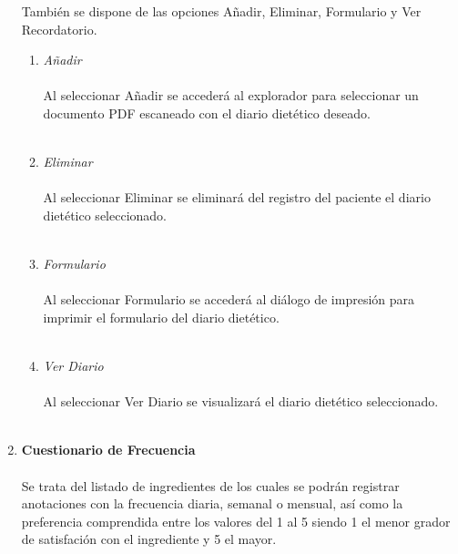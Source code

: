 \begin{enumerate}
También se dispone de las opciones Añadir, Eliminar, Formulario y Ver Recordatorio.
\begin{enumerate}
\item \textit{Añadir}\\\\
Al seleccionar Añadir se accederá al explorador para seleccionar un documento PDF escaneado con el diario dietético deseado.\\\\
\item \textit{Eliminar}\\\\
Al seleccionar Eliminar se eliminará del registro del paciente el diario dietético seleccionado.\\\\
\item \textit{Formulario}\\\\
Al seleccionar Formulario se accederá al diálogo de impresión para imprimir el formulario del diario dietético.\\\\
\item \textit{Ver Diario}\\\\
Al seleccionar Ver Diario se visualizará el diario dietético seleccionado.\\\\
\end{enumerate}
\item \textbf{Cuestionario de Frecuencia}\\\\
Se trata del listado de ingredientes de los cuales se podrán registrar anotaciones con la frecuencia diaria, semanal o mensual, así como la preferencia comprendida entre los valores del 1 al 5 siendo 1 el menor grador de satisfación con el ingrediente y 5 el mayor.\\\\
\begin{figure}[H]
  \label{cuestfrec}
  \begin{center}

\end{center}
\end{figure}
\end{enumerate}

